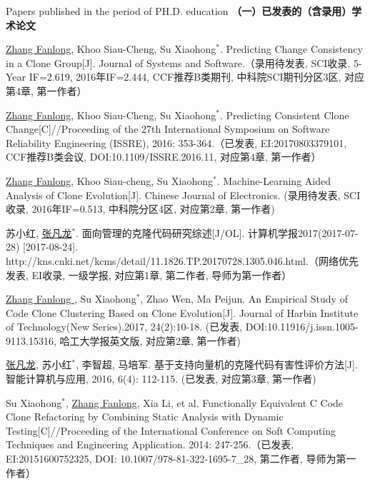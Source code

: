 
 {Papers
published in the period of PH.D. education}
\noindent\textbf{（一）已发表的（含录用）学术论文}
\begin{publist}

\item
\underline{Zhang Fanlong}, Khoo Siau-Cheng, Su Xiaohong{$^*$}. Predicting Change Consistency in a Clone Group[J]. Journal of Systems and Software.（录用待发表, SCI收录,  5-Year IF=2.619, 2016年IF=2.444, CCF推荐B类期刊, 中科院SCI期刊分区3区, 对应第4章, 第一作者）

\item
\underline{Zhang Fanlong}, Khoo Siau-Cheng, Su Xiaohong{$^*$}. Predicting Consistent Clone Change[C]//Proceeding of the 27th International Symposium on Software Reliability Engineering (ISSRE), 2016: 353-364.（已发表, EI:20170803379101, CCF推荐B类会议, DOI:10.1109/ISSRE.2016.11, 对应第4章, 第一作者）
\item
\underline{Zhang Fanlong}, Khoo Siau-cheng, Su Xiaohong{$^*$}. Machine-Learning Aided Analysis of Clone Evolution[J]. Chinese Journal of Electronics. (录用待发表, SCI收录, 2016年IF=0.513, 中科院分区4区, 对应第2章, 第一作者)

\item
苏小红, \underline{张凡龙}{$^*$}. 面向管理的克隆代码研究综述[J/OL]. 计算机学报2017(2017-07-28) [2017-08-24]. http://kns.cnki.net/kcms/detail/11.1826.TP.20170728.1305.046.html.（网络优先发表, EI收录, 一级学报, 对应第1章, 第二作者, 导师为第一作者）

\item
\underline{Zhang Fanlong }, Su Xiaohong{$^*$},  Zhao Wen,  Ma Peijun. An Empirical Study of Code Clone Clustering Based on Clone Evolution[J]. Journal of Harbin Institute of Technology(New Series).2017, 24(2):10-18. (已发表, DOI:10.11916/j.issn.1005-9113.15316, 哈工大学报英文版, 对应第2章, 第一作者)

\item
\underline{张凡龙}, 苏小红{$^*$},  李智超,  马培军. 基于支持向量机的克隆代码有害性评价方法[J]. 智能计算机与应用, 2016, 6(4): 112-115. (已发表, 对应第3章, 第一作者)

\item
Su Xiaohong{$^*$}, \underline{Zhang Fanlong},  Xia Li, et al. Functionally Equivalent C Code Clone Refactoring by Combining Static Analysis with Dynamic Testing[C]//Proceeding of the International Conference on Soft Computing Techniques and Engineering Application. 2014: 247-256.（已发表, EI:20151600752325, DOI: 10.1007/978-81-322-1695-7\_28, 第二作者, 导师为第一作者）
\end{publist}

